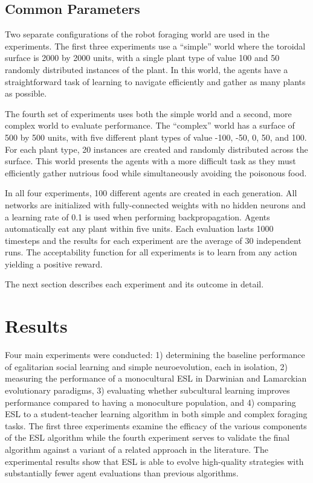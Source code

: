 \documentclass{sig-alternate}
\begin{document}
\subsection*{Common Parameters}

Two separate configurations of the robot foraging world are used in the experiments. The first three experiments use a ``simple'' world where the toroidal surface is 2000 by 2000 units, with a single plant type of value 100 and 50 randomly distributed instances of the plant. In this world, the agents have a straightforward task of learning to navigate efficiently and gather as many plants as possible.

The fourth set of experiments uses both the simple world and a second, more complex world to evaluate performance. The ``complex'' world has a surface of 500 by 500 units, with five different plant types of value -100, -50, 0, 50, and 100. For each plant type, 20 instances are created and randomly distributed across the surface. This world presents the agents with a more difficult task as they must efficiently gather nutrious food while simultaneously avoiding the poisonous food.

In all four experiments, 100 different agents are created in each generation. All networks are initialized with fully-connected weights with no hidden neurons and a learning rate of 0.1 is used when performing backpropagation. Agents automatically eat any plant within five units. Each evaluation lasts 1000 timesteps and the results for each experiment are the average of 30 independent runs. The acceptability function for all experiments is to learn from any action yielding a positive reward.

The next section describes each experiment and its outcome in detail.


\section{Results}
\label{sec:results}
Four main experiments were conducted: 1) determining the baseline performance of egalitarian social learning and simple neuroevolution, each in isolation, 2) measuring the performance of a monocultural ESL in Darwinian and Lamarckian evolutionary paradigms, 3) evaluating whether subcultural learning improves performance compared to having a monoculture population, and 4) comparing ESL to a student-teacher learning algorithm in both simple and complex foraging tasks. The first three experiments examine the efficacy of the various components of the ESL algorithm while the fourth experiment serves to validate the final algorithm against a variant of a related approach in the literature. The experimental results show that ESL is able to evolve high-quality strategies with substantially fewer agent evaluations than previous algorithms.
\end{document}
